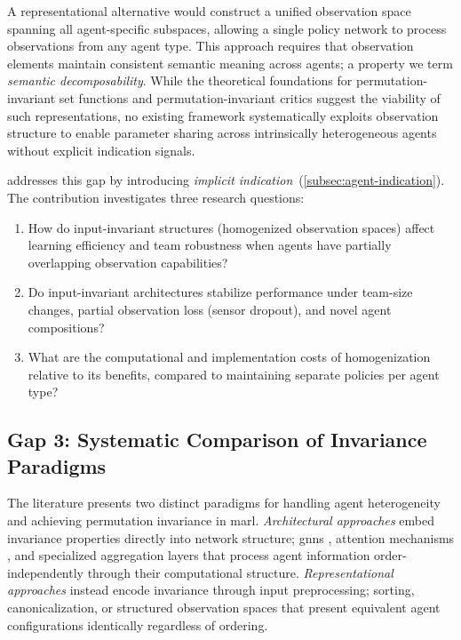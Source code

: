 A representational alternative would construct a unified observation 
space spanning all agent-specific subspaces, allowing a single policy 
network to process observations from any agent type. This approach 
requires that observation elements maintain consistent semantic meaning across agents;
a property we term \emph{semantic decomposability}. 
While the theoretical foundations for permutation-invariant set 
functions \cite{zaheer2017} and permutation-invariant critics \cite{liu2020b} 
suggest the viability of such representations, no existing framework 
systematically exploits observation structure to enable parameter sharing across 
intrinsically heterogeneous agents without explicit indication signals.

\textbf{} addresses this gap by 
introducing \emph{implicit indication}~(\cref{subsec:agent-indication}). 
The contribution investigates three research questions:

\begin{enumerate}[label=\textbf{RQ2.\arabic*:}, leftmargin=2.5cm]
    \item How do input-invariant structures (homogenized observation spaces) 
    affect learning efficiency and team robustness when agents have partially 
    overlapping observation capabilities?
    \item Do input-invariant architectures stabilize performance under team-size 
    changes, partial observation loss (sensor dropout), and novel agent compositions?
    \item What are the computational and implementation costs of homogenization 
    relative to its benefits, compared to maintaining separate policies per agent type?
\end{enumerate}

\subsection{Gap 3: Systematic Comparison of Invariance Paradigms}
\label{sec:gap3}

The literature presents two distinct paradigms for handling agent heterogeneity 
and achieving permutation invariance in \gls{marl}. \emph{Architectural approaches} 
embed invariance properties directly into network structure;
\glspl{gnn} \cite{yang2021a}, attention mechanisms \cite{vaswani2017, iqbal2019}, 
and specialized aggregation layers \cite{liu2020b} that process agent information 
order-independently through their computational structure. 
\emph{Representational approaches} instead encode invariance through input preprocessing;
sorting, canonicalization, or structured observation spaces that present equivalent agent 
configurations identically regardless of ordering.

